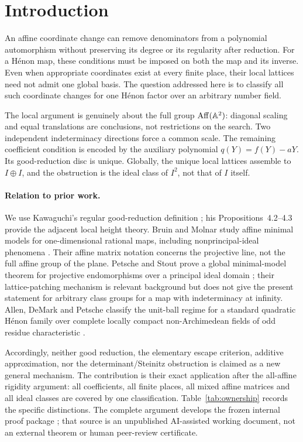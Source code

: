 \section{Introduction}

An affine coordinate change can remove denominators from a polynomial
automorphism without preserving its degree or its regularity after
reduction. For a H\'enon map, these conditions must be imposed on both
the map and its inverse. Even when appropriate coordinates exist at
every finite place, their local lattices need not admit one global
basis. The question addressed here is to classify all such coordinate
changes for one H\'enon factor over an arbitrary number field.

The local argument is genuinely about the full group
$\operatorname{Aff}(\mathbb A^2)$: diagonal scaling and equal translations are
conclusions, not restrictions on the search. Two independent
indeterminacy directions force a common scale. The remaining
coefficient condition is encoded by the auxiliary polynomial
$q(Y)=f(Y)-aY$. Its good-reduction disc is unique. Globally, the unique
local lattices assemble to $I\oplus I$, and the obstruction is the
ideal class of $I^2$, not that of $I$ itself.

\paragraph{Relation to prior work.}
We use Kawaguchi's regular good-reduction definition
\cite[Definition~4.1]{Kawaguchi2013}; his
Propositions~4.2--4.3 provide the adjacent local height theory.
Bruin and Molnar study affine minimal models for one-dimensional
rational maps, including nonprincipal-ideal phenomena
\cite[Proposition~2.10 and Section~6]{BruinMolnar2012}.
Their affine matrix notation concerns the projective line, not the
full affine group of the plane. Petsche and Stout prove a global
minimal-model theorem for projective endomorphisms over a principal
ideal domain \cite{PetscheStout2014}; their lattice-patching mechanism
is relevant background but does not give the present statement for
arbitrary class groups for a map with indeterminacy at infinity.
Allen, DeMark and Petsche classify the unit-ball regime for a standard
quadratic H\'enon family over complete locally compact
non-Archimedean fields of odd residue characteristic
\cite[Theorem~11]{AllenDeMarkPetsche2018}.

Accordingly, neither good reduction, the elementary escape criterion,
additive approximation, nor the determinant/Steinitz obstruction is
claimed as a new general mechanism. The contribution is their exact
application after the all-affine rigidity argument: all coefficients,
all finite places, all mixed affine matrices and all ideal classes are
covered by one classification. Table~\ref{tab:ownership} records the
specific distinctions. The complete argument develops the frozen
internal proof package \cite{GR5WorkingNotes}; that source is an
unpublished AI-assisted working document, not an external theorem or
human peer-review certificate.

